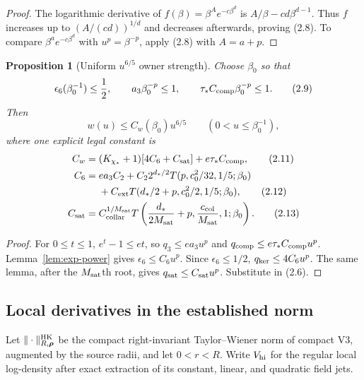 \documentclass[11pt]{article}
\newtheorem{proposition}[theorem]{Proposition}
\theoremstyle{definition}
\theoremstyle{remark}
\begin{document}
\begin{proof}
The logarithmic derivative of $f(\beta)=\beta^Ae^{-c\beta^d}$ is
$A/\beta-cd\beta^{d-1}$.  Thus $f$ increases up to
$(A/(cd))^{1/d}$ and decreases afterwards, proving (2.8).
To compare $\beta^ae^{-c\beta^d}$ with
$u^p=\beta^{-p}$, apply (2.8) with $A=a+p$.
\end{proof}

\begin{proposition}[Uniform $u^{6/5}$ owner strength]
\label{prop:w-power}
Choose $\beta_0$ so that
\[
 \epsilon_6(\beta_0^{-1})\le\frac12,\qquad
 a_3\beta_0^{-p}\le1,\qquad
 \tau_*C_{\rm comp}\beta_0^{-p}\le1.                      \tag{2.9}
\]
Then
\[
 \boxed{w(u)\le C_w(\beta_0)u^{6/5}}
 \qquad(0<u\le\beta_0^{-1}),                               \tag{2.10}
\]
where one explicit legal constant is
\begin{align}
 C_w={}&(K_{\chi_*}+1)[4C_6+C_{\rm sat}]
       +e\tau_*C_{\rm comp},                               \tag{2.11}\\
 C_6={}&e a_3C_2
 +C_2 2^{d_*/2}T(p,c_0^2/32,1/5;\beta_0)\\
 &+C_{\rm ext}T(d_*/2+p,c_0^2/2,1/5;\beta_0),              \tag{2.12}\\
 C_{\rm sat}={}&C_{\rm collar}^{1/M_{\rm sat}}
 T\left(\frac{d_*}{2M_{\rm sat}}+p,
         \frac{c_{\rm col}}{M_{\rm sat}},1;\beta_0\right).
                                                                    \tag{2.13}
\end{align}
\end{proposition}

\begin{proof}
For $0\le t\le1$, $e^t-1\le et$, so
$q_3\le ea_3u^p$ and
$q_{\rm comp}\le e\tau_*C_{\rm comp}u^p$.
Lemma~\ref{lem:exp-power} gives
$\epsilon_6\le C_6u^p$.  Since $\epsilon_6\le1/2$,
$q_{\rm ker}\le4C_6u^p$.  The same lemma, after the
$M_{\rm sat}$th root, gives
$q_{\rm sat}\le C_{\rm sat}u^p$.  Substitute in (2.6).
\end{proof}

\subsection{Local derivatives in the established norm}

Let $\|\cdot\|_{R,\boldsymbol\rho}^{\rm HK}$ be the compact
right-invariant Taylor--Wiener norm of compact V3, augmented by the source
radii, and let $0<r<R$.  Write $V_{\rm hi}$ for the regular local log-density
after exact extraction of its constant, linear, and quadratic field jets.
\end{document}
